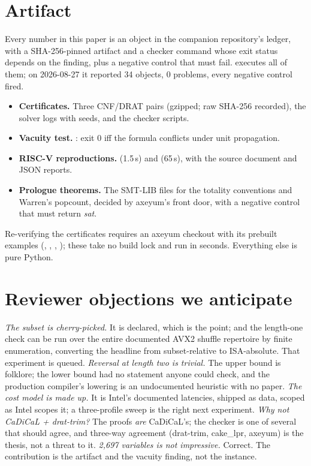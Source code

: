 \section{Artifact}
\label{app:artifact}

Every number in this paper is an object in the companion repository's ledger, with a SHA-256-pinned artifact and a checker command whose exit status depends on the finding, plus a negative control that must fail.  executes all of them; on 2026-08-27 it reported 34 objects, 0 problems, every negative control fired.

\begin{itemize}
\item \textbf{Certificates.} Three CNF/DRAT pairs (gzipped; raw SHA-256 recorded), the solver logs with seeds, and the checker scripts.
\item \textbf{Vacuity test.} : exit 0 iff the formula conflicts under unit propagation.
\item \textbf{RISC-V reproductions.}  (1.5\,s) and  (65\,s), with the source document and JSON reports.
\item \textbf{Prologue theorems.} The SMT-LIB files for the totality conventions and Warren's popcount, decided by axeyum's front door, with a negative control that must return \emph{sat}.
\end{itemize}

Re-verifying the certificates requires an axeyum checkout with its prebuilt examples (, , , ); these take no build lock and run in seconds. Everything else is pure Python.

\section{Reviewer objections we anticipate}
\label{app:objections}

\emph{The subset is cherry-picked.} It is declared, which is the point; and the length-one check can be run over the entire documented AVX2 shuffle repertoire by finite enumeration, converting the headline from subset-relative to ISA-absolute. That experiment is queued. \emph{Reversal at length two is trivial.} The upper bound is folklore; the lower bound had no statement anyone could check, and the production compiler's lowering is an undocumented heuristic with no paper. \emph{The cost model is made up.} It is Intel's documented latencies, shipped as data, scoped as Intel scopes it; a three-profile sweep is the right next experiment. \emph{Why not CaDiCaL + drat-trim?} The proofs \emph{are} CaDiCaL's; the checker is one of several that should agree, and three-way agreement (drat-trim, cake\_lpr, axeyum) is the thesis, not a threat to it. \emph{2,697 variables is not impressive.} Correct. The contribution is the artifact and the vacuity finding, not the instance.
